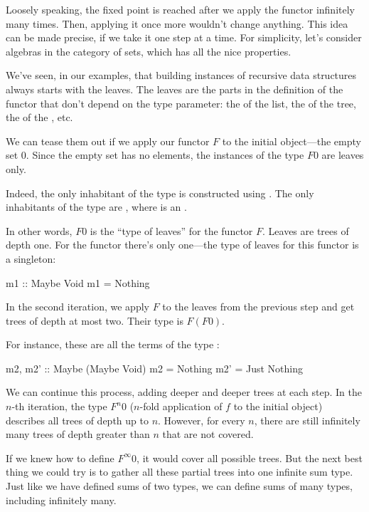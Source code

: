 \documentclass[DaoFP]{subfiles}
\begin{document}
Loosely speaking, the fixed point is reached after we apply the functor infinitely many times. Then, applying it once more wouldn't change anything. This idea can be made precise, if we take it one step at a time. For simplicity, let's consider algebras in the category of sets, which has all the nice properties.

We've seen, in our examples, that building instances of recursive data structures always starts with the leaves. The leaves are the parts in the definition of the functor that don't depend on the type parameter: the  of the list, the  of the tree, the  of the , etc. 

We can tease them out if we apply our functor $F$ to the initial object---the empty set $0$. Since the empty set has no elements, the instances of the type $F 0$ are leaves only. 

Indeed, the only inhabitant of the type  is constructed using . The only inhabitants of the type  are , where  is an .

In other words, $F 0$ is the ``type of leaves'' for the functor $F$. Leaves are trees of depth one. For the  functor there's only one---the type of leaves for this functor is a singleton:
\begin{haskell}
m1 :: Maybe Void
m1 = Nothing
\end{haskell}

In the second iteration, we apply $F$ to the leaves from the previous step and get trees of depth at most two. Their type is $F(F 0)$. 

For instance, these are all the terms of the type :
\begin{haskell}
m2, m2' :: Maybe (Maybe Void)
m2 = Nothing
m2' = Just Nothing
\end{haskell}

We can continue this process, adding deeper and deeper trees at each step. In the $n$-th iteration, the type $F^n 0$ ($n$-fold application of $f$ to the initial object) describes all trees of depth up to $n$. However, for every $n$, there are still infinitely many trees of depth greater than $n$ that are not covered. 

If we knew how to define $F^{\infty} 0$, it would cover all possible trees. But the next best thing we could try is to gather all these partial trees into one infinite sum type. Just like we have defined sums of two types, we can define sums of many types, including infinitely many. 
\end{document}
